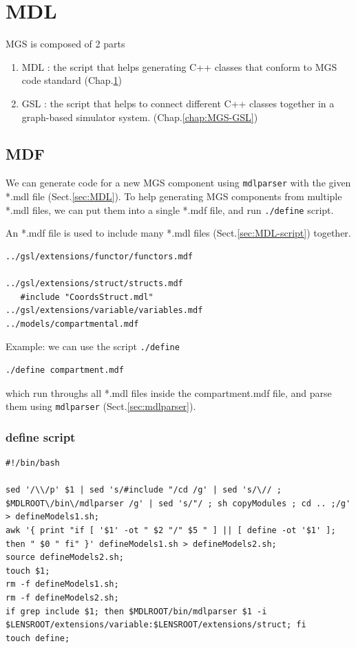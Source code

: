 \chapter{MDL}
\label{chap:MGS-MDL}

MGS is composed of 2 parts
\begin{enumerate}
  \item MDL : the script that helps generating C++ classes that conform to MGS
  code standard (Chap.\ref{chap:MGS-MDL})
  
  \item GSL : the script that helps to connect different C++ classes together in
  a graph-based simulator system. (Chap.\ref{chap:MGS-GSL}) 
\end{enumerate}

\section{MDF}
\label{sec:MDF}

We can generate code for a new MGS component using \verb!mdlparser! with the
given *.mdl file (Sect.\ref{sec:MDL}). To help generating MGS components from
multiple *.mdl files, we can put them into a single *.mdf file, and run
\verb!./define! script.

An *.mdf file is used to include many *.mdl files (Sect.\ref{sec:MDL-script})
together. 
\begin{verbatim}
../gsl/extensions/functor/functors.mdf

../gsl/extensions/struct/structs.mdf
   #include "CoordsStruct.mdl"    
../gsl/extensions/variable/variables.mdf
../models/compartmental.mdf
\end{verbatim}

Example: we can use the script \verb!./define!
\begin{verbatim}
./define compartment.mdf
\end{verbatim}
which run throughs all *.mdl files inside the compartment.mdf file, and
parse them using \verb!mdlparser! (Sect.\ref{sec:mdlparser}).

\subsection{define script}

{\tiny
\begin{verbatim}
#!/bin/bash

sed '/\\/p' $1 | sed 's/#include "/cd /g' | sed 's/\// ; $MDLROOT\/bin\/mdlparser /g' | sed 's/"/ ; sh copyModules ; cd .. ;/g' > defineModels1.sh;
awk '{ print "if [ '$1' -ot " $2 "/" $5 " ] || [ define -ot '$1' ]; then " $0 " fi" }' defineModels1.sh > defineModels2.sh;
source defineModels2.sh;
touch $1;
rm -f defineModels1.sh;
rm -f defineModels2.sh;
if grep include $1; then $MDLROOT/bin/mdlparser $1 -i $LENSROOT/extensions/variable:$LENSROOT/extensions/struct; fi
touch define;
\end{verbatim}
}

